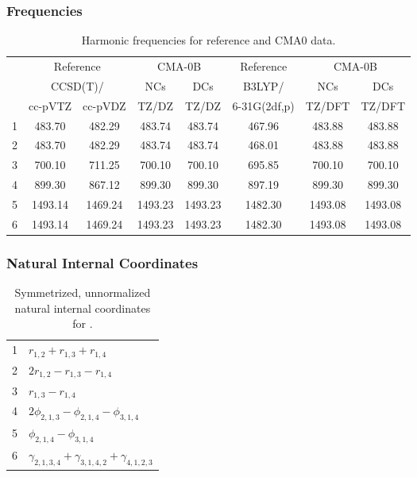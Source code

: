 \documentclass[10pt,oneside]{article}
\begin{document}
\clearpage

\subsubsection*{Frequencies}
\begin{table}[h!]
\centering
\caption{Harmonic frequencies for reference and CMA0 data.}
\begin{tabular}{cccccccc}
\toprule
{} & \multicolumn{2}{c}{Reference} & \multicolumn{2}{c}{CMA-0B} &    Reference & \multicolumn{2}{c}{CMA-0B} \\
{} & \multicolumn{2}{c}{CCSD(T)/} &     NCs &     DCs &       B3LYP/ &     NCs &     DCs \\
{} &   cc-pVTZ & cc-pVDZ &   TZ/DZ &   TZ/DZ & 6-31G(2df,p) &  TZ/DFT &  TZ/DFT \\
\midrule
1 &    483.70 &  482.29 &  483.74 &  483.74 &       467.96 &  483.88 &  483.88 \\
2 &    483.70 &  482.29 &  483.74 &  483.74 &       468.01 &  483.88 &  483.88 \\
3 &    700.10 &  711.25 &  700.10 &  700.10 &       695.85 &  700.10 &  700.10 \\
4 &    899.30 &  867.12 &  899.30 &  899.30 &       897.19 &  899.30 &  899.30 \\
5 &   1493.14 & 1469.24 & 1493.23 & 1493.23 &      1482.30 & 1493.08 & 1493.08 \\
6 &   1493.14 & 1469.24 & 1493.23 & 1493.23 &      1482.30 & 1493.08 & 1493.08 \\
\bottomrule
\end{tabular}
\end{table}

\clearpage

\subsubsection*{Natural Internal Coordinates}
\begin{table}[h!]
\centering
\caption{Symmetrized, unnormalized natural internal coordinates for .}
\small
\begin{tabular}{ll}
  1   & $r_{1,2} + r_{1,3} + r_{1,4}$ \\
  2   & $2r_{1,2} - r_{1,3} - r_{1,4}$ \\
  3   & $r_{1,3} - r_{1,4}$ \\
  4   & $2\phi_{2,1,3} - \phi_{2,1,4} - \phi_{3,1,4}$ \\
  5   & $\phi_{2,1,4} - \phi_{3,1,4}$ \\
  6   & $\gamma_{2,1,3,4} + \gamma_{3,1,4,2} + \gamma_{4,1,2,3}$ \\
\end{tabular}
\end{table}
\end{document}
